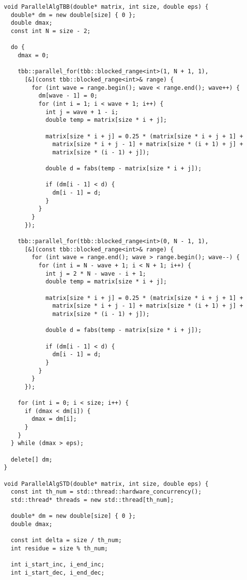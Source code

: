 \documentclass{report}
\begin{document}
\begin{lstlisting}
void ParallelAlgTBB(double* matrix, int size, double eps) {
  double* dm = new double[size] { 0 };
  double dmax;
  const int N = size - 2;

  do {
    dmax = 0;

    tbb::parallel_for(tbb::blocked_range<int>(1, N + 1, 1),
      [&](const tbb::blocked_range<int>& range) {
        for (int wave = range.begin(); wave < range.end(); wave++) {
          dm[wave - 1] = 0;
          for (int i = 1; i < wave + 1; i++) {
            int j = wave + 1 - i;
            double temp = matrix[size * i + j];

            matrix[size * i + j] = 0.25 * (matrix[size * i + j + 1] +
              matrix[size * i + j - 1] + matrix[size * (i + 1) + j] +
              matrix[size * (i - 1) + j]);

            double d = fabs(temp - matrix[size * i + j]);

            if (dm[i - 1] < d) {
              dm[i - 1] = d;
            }
          }
        }
      });

    tbb::parallel_for(tbb::blocked_range<int>(0, N - 1, 1),
      [&](const tbb::blocked_range<int>& range) {
        for (int wave = range.end(); wave > range.begin(); wave--) {
          for (int i = N - wave + 1; i < N + 1; i++) {
            int j = 2 * N - wave - i + 1;
            double temp = matrix[size * i + j];

            matrix[size * i + j] = 0.25 * (matrix[size * i + j + 1] +
              matrix[size * i + j - 1] + matrix[size * (i + 1) + j] +
              matrix[size * (i - 1) + j]);

            double d = fabs(temp - matrix[size * i + j]);

            if (dm[i - 1] < d) {
              dm[i - 1] = d;
            }
          }
        }
      });

    for (int i = 0; i < size; i++) {
      if (dmax < dm[i]) {
        dmax = dm[i];
      }
    }
  } while (dmax > eps);

  delete[] dm;
}

void ParallelAlgSTD(double* matrix, int size, double eps) {
  const int th_num = std::thread::hardware_concurrency();
  std::thread* threads = new std::thread[th_num];

  double* dm = new double[size] { 0 };
  double dmax;

  const int delta = size / th_num;
  int residue = size % th_num;

  int i_start_inc, i_end_inc;
  int i_start_dec, i_end_dec;


\end{lstlisting}
\end{document}
